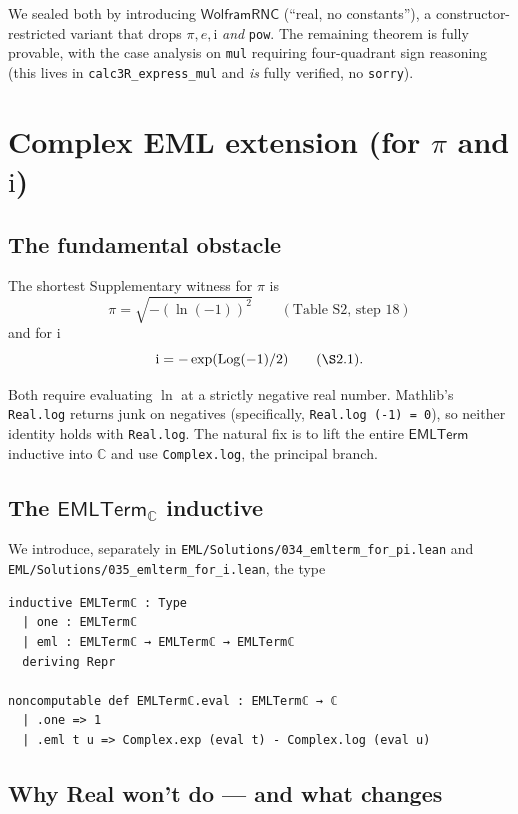 \documentclass[11pt,a4paper]{article}
\theoremstyle{plain}
\theoremstyle{definition}
\newcommand{\C}{\mathbb{C}}
\newcommand{\imu}{\mathrm{i}}
\newcommand{\EMLT}{\mathsf{EMLTerm}}
\newcommand{\EMLTC}{\mathsf{EMLTerm}_\C}
\begin{document}
We sealed both by introducing $\mathsf{WolframRNC}$ (``real,
no constants''), a constructor-restricted variant that drops $\pi,e,\imu$
\emph{and} \texttt{pow}.  The remaining theorem is fully provable, with
the case analysis on \texttt{mul} requiring four-quadrant sign reasoning
(this lives in \texttt{calc3R\_express\_mul} and \emph{is} fully
verified, no \texttt{sorry}).

\section{Complex EML extension (for $\pi$ and $\imu$)}\label{sec:complex}

\subsection{The fundamental obstacle}

The shortest Supplementary witness for $\pi$ is
\[
   \pi = \sqrt{-(\ln(-1))^2}\qquad(\text{Table S2, step 18})
\]
and for $\imu$
\[
   \imu = -\exp(\mathrm{Log}(-1)/2)\qquad(\S 2.1).
\]

Both require evaluating $\ln$ at a strictly negative real number.
Mathlib's \texttt{Real.log} returns junk on negatives (specifically,
\texttt{Real.log\,(-1)\,=\,0}), so neither identity holds with
\texttt{Real.log}.  The natural fix is to lift the entire $\EMLT$
inductive into $\C$ and use \texttt{Complex.log}, the principal
branch.

\subsection{The $\EMLTC$ inductive}

We introduce, separately in
\texttt{EML/Solutions/034\_emlterm\_for\_pi.lean} and
\texttt{EML/Solutions/035\_emlterm\_for\_i.lean}, the type

\begin{lstlisting}
inductive EMLTermℂ : Type
  | one : EMLTermℂ
  | eml : EMLTermℂ → EMLTermℂ → EMLTermℂ
  deriving Repr

noncomputable def EMLTermℂ.eval : EMLTermℂ → ℂ
  | .one => 1
  | .eml t u => Complex.exp (eval t) - Complex.log (eval u)
\end{lstlisting}

\subsection{Why Real won't do --- and what changes}
\end{document}
